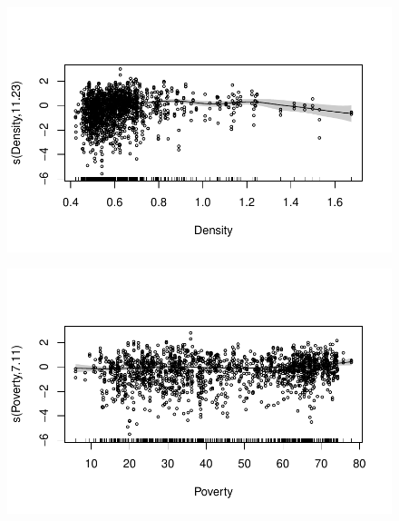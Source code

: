 \documentclass[
  letterpaper,
  DIV=11,
  numbers=noendperiod]{scrartcl}
\begin{document}
\begin{figure}[H]

{\centering \includegraphics{Group34Coursework_files/figure-pdf/unnamed-chunk-18-4.pdf}

}

\end{figure}

\begin{figure}[H]

{\centering \includegraphics{Group34Coursework_files/figure-pdf/unnamed-chunk-18-5.pdf}

}

\end{figure}
\end{document}
